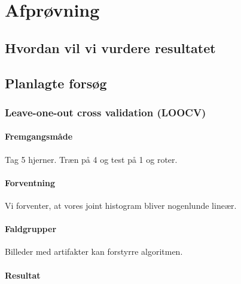\section{Afprøvning}

\subsection{Hvordan vil vi vurdere resultatet}


\subsection{Planlagte forsøg}

\subsubsection{Leave-one-out cross validation (LOOCV)}
\paragraph{Fremgangsmåde}
Tag 5 hjerner. Træn på 4 og test på 1 og roter.


\paragraph{Forventning}
Vi forventer, at vores joint histogram bliver nogenlunde lineær. 

\paragraph{Faldgrupper}
Billeder med artifakter kan forstyrre algoritmen. 

\paragraph{Resultat}

